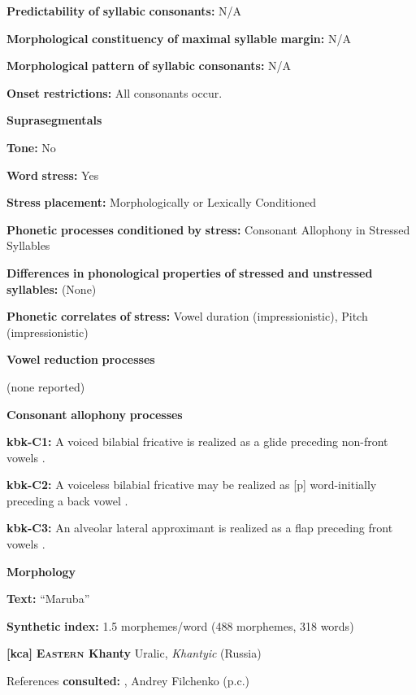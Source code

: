 \textbf{Predictability} \textbf{of} \textbf{syllabic} \textbf{consonants:} N/A

\textbf{Morphological} \textbf{constituency} \textbf{of} \textbf{maximal} \textbf{syllable} \textbf{margin:} N/A

\textbf{Morphological} \textbf{pattern} \textbf{of} \textbf{syllabic} \textbf{consonants:} N/A

\textbf{Onset} \textbf{restrictions:} All consonants occur.

\textbf{Suprasegmentals}

\textbf{Tone:} No

\textbf{Word} \textbf{stress:} Yes

\textbf{Stress} \textbf{placement:} Morphologically or Lexically Conditioned

\textbf{Phonetic} \textbf{processes} \textbf{conditioned} \textbf{by} \textbf{stress:} Consonant Allophony in Stressed Syllables

\textbf{Differences} \textbf{in} \textbf{phonological} \textbf{properties} \textbf{of} \textbf{stressed} \textbf{and} \textbf{unstressed} \textbf{syllables:} (None) 

\textbf{Phonetic} \textbf{correlates} \textbf{of} \textbf{stress:} Vowel duration (impressionistic), Pitch (impressionistic)

\textbf{Vowel} \textbf{reduction} \textbf{processes}

(none reported)

\textbf{Consonant} \textbf{allophony} \textbf{processes}

\textbf{kbk-C1:} A voiced bilabial fricative is realized as a glide preceding non-front vowels \citep{Dutton1996}.

\textbf{kbk-C2:} A voiceless bilabial fricative may be realized as [p] word-initially preceding a back vowel \citep{Dutton1996}.

\textbf{kbk-C3:} An alveolar lateral approximant is realized as a flap preceding front vowels \citep{Dutton1996}.

\textbf{Morphology}

\textbf{Text:} “Maruba” \citep[72-76]{Dutton1996}

\textbf{Synthetic} \textbf{index:} 1.5 morphemes/word (488 morphemes, 318 words)

\textbf{[kca]}   \textbf{\textsc{Eastern} \textbf{Khanty}}  Uralic, \textit{Khantyic} (Russia)

References \textbf{consulted:} \citet{Filchenko2007}, Andrey Filchenko (p.c.)

